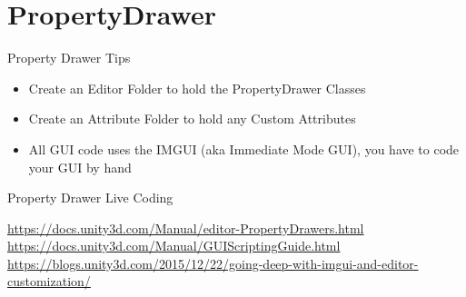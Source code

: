 \part{PropertyDrawer}
\frame{\partpage}

\begin{frame}{Property Drawer Tips}
	\begin{itemize}
		\item Create an Editor Folder to hold the PropertyDrawer Classes
		\item Create an Attribute Folder to hold any Custom Attributes
		\item All GUI code uses the IMGUI (aka Immediate Mode GUI), you have to code your GUI by hand
	\end{itemize}
\end{frame}


\begin{frame}
	\begin{center}
		Property Drawer Live Coding
	\end{center}
\end{frame}

\begin{frame}
	\url{https://docs.unity3d.com/Manual/editor-PropertyDrawers.html}
	\url{https://docs.unity3d.com/Manual/GUIScriptingGuide.html}
	\url{https://blogs.unity3d.com/2015/12/22/going-deep-with-imgui-and-editor-customization/}
\end{frame}